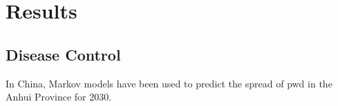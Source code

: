 \section{Results}

\subsection{Disease Control}

In China, Markov models have been used to predict the spread of \gls{pwd} in the Anhui Province \parencite{liu2022occurrence} for 2030.

